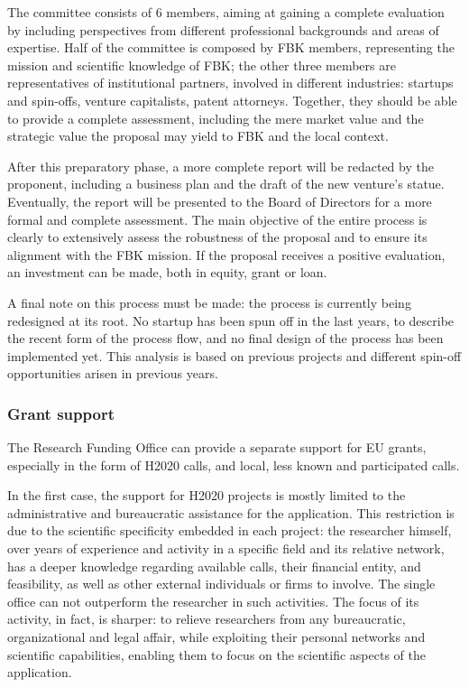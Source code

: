 The committee consists of 6 members, aiming at gaining a complete evaluation by including perspectives from different professional backgrounds and areas of expertise. Half of the committee is composed by FBK members, representing the mission and scientific knowledge of FBK; the other three members are representatives of institutional partners, involved in different industries: startups and spin-offs, venture capitalists, patent attorneys. Together, they should be able to provide a complete assessment, including the mere market value and the strategic value the proposal may yield to FBK and the local context.

After this preparatory phase, a more complete report will be redacted by the proponent, including a business plan and the draft of the new venture's statue. Eventually, the report will be presented to the Board of Directors for a more formal and complete assessment. The main objective of the entire process is clearly to extensively assess the robustness of the proposal and to ensure its alignment with the FBK mission. If the proposal receives a positive evaluation, an investment can be made, both in equity, grant or loan.

A final note on this process must be made: the process is currently being redesigned at its root. No startup has been spun off in the last years, to describe the recent form of the process flow, and no final design of the process has been implemented yet. This analysis is based on previous projects and different spin-off opportunities arisen in previous years.	

\subsubsection{Grant support}

The Research Funding Office can provide a separate support for EU grants, especially in the form of H2020 calls, and local, less known and participated calls.

In the first case, the support for H2020 projects is mostly limited to the administrative and bureaucratic assistance for the application. This restriction is due to the scientific specificity embedded in each project: the researcher himself, over years of experience and activity in a specific field and its relative network, has a deeper knowledge regarding available calls, their financial entity, and feasibility, as well as other external individuals or firms to involve. The single office can not outperform the researcher in such activities. The focus of its activity, in fact, is sharper: to relieve researchers from any bureaucratic, organizational and legal affair, while exploiting their personal networks and scientific capabilities, enabling them to focus on the scientific aspects of the application.

